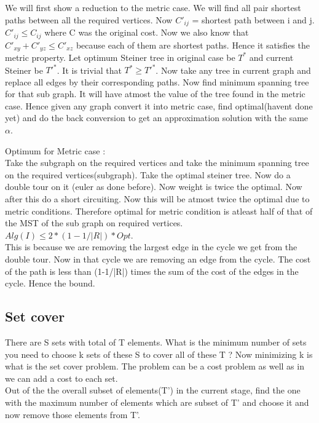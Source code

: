 \documentclass[solution,addpoints,12pt]{exam}
\begin{document}
We will first show a reduction to the metric case. We will find
all pair shortest paths between all the required vertices.
Now $C'_{ij}$ = shortest path between i and j.
$C'_{ij} \le C_{ij}$ where C was the original cost.
Now we also know that $C'_{xy} + C'_{yz} \le C'_{xz}$
because each of them are shortest paths. Hence it satisfies the metric
property. Let optimum Steiner tree in original case be $T^*$ and
current Steiner be ${T'}^*$. It is trivial that $T^* \ge {T'}^*$.
Now take any tree in current graph and replace all edges by their
corresponding paths. Now find minimum spanning tree for that sub graph.
It will have atmost the value of the tree found in the metric
case. Hence given any graph convert it into metric case,
find optimal(havent done yet) and do the back conversion to get an
approximation solution with the same $\alpha$.

Optimum for Metric case :\\
Take the subgraph on the required vertices and take
the minimum spanning tree on the required vertices(subgraph).
Take the optimal steiner tree. Now do a double tour on it
(euler as done before). Now weight is twice the optimal.
Now after this do a short circuiting. Now this will be
atmost twice the optimal due to metric conditions.
Therefore optimal for metric condition is atleast
half of that of the MST of the sub graph on required vertices.\\

$Alg(I) \le 2*(1 - 1/|R|)*Opt$.\\
This is because we are removing the largest edge
in the cycle we get from the double tour. Now
in that cycle we are removing an edge from the cycle.
The cost of the path is less than (1-1/|R|) times the
sum of the cost of the edges in the cycle. Hence the bound.\\

\subsection{Set cover}
There are S sets with total of T elements.
What is the minimum number of sets you need to choose
k sets of these S to cover all of these T ?
Now minimizing k is what is the set cover problem.
The problem can be a cost problem as well as in we can
add a cost to each set.\\

Out of the the overall subset of elements(T') in the current stage,
find the one with the maximum number of elements which are
subset of T' and choose it and now remove those elements from T'.\\
\end{document}

